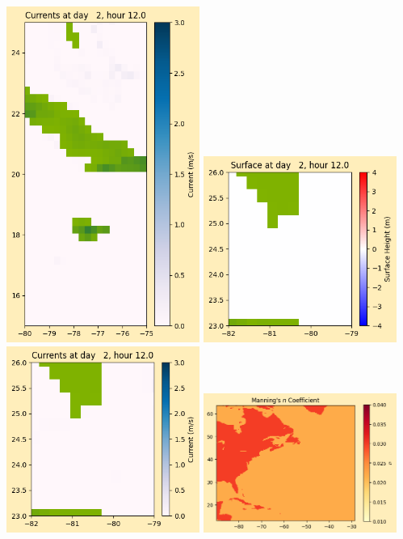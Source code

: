 \documentclass[11pt]{article}
\begin{document}
\includegraphics[width=0.475\textwidth]{frame0022fig1008.png}
\vskip 10pt 
\includegraphics[width=0.475\textwidth]{frame0022fig1009.png}
\includegraphics[width=0.475\textwidth]{frame0022fig1010.png}
\vskip 10pt 
\includegraphics[width=0.475\textwidth]{frame0022fig1011.png}
\end{document}
